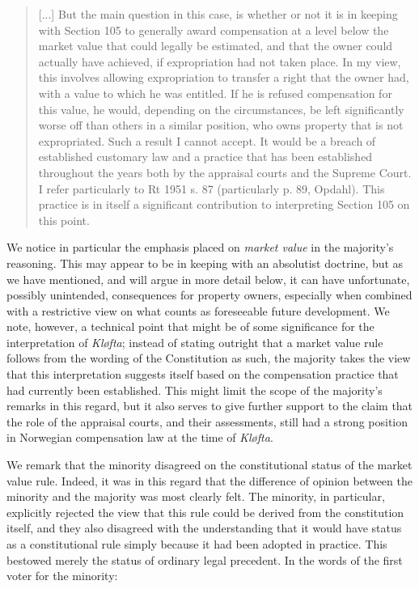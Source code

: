 \begin{quote}
[...] But the main question in this case, is whether or not it is in keeping with Section 105 to generally award compensation at a level below the market value that could legally be estimated, and that the owner could actually have achieved, if expropriation had not taken place. In my view, this involves allowing expropriation to transfer a right that the owner had, with a value to which he was entitled. If he is refused compensation for this value, he would, depending on the circumstances, be left significantly worse off than others in a similar position, who owns property that is not expropriated. Such a result I cannot accept. It would be a breach of established customary law and a practice that has been established throughout the years both by the appraisal courts and the Supreme Court. I refer particularly to Rt 1951 s. 87 (particularly p. 89, Opdahl). This practice is in itself a significant contribution to interpreting Section 105 on this point.
\end{quote}

We notice in particular the emphasis placed on \emph{market value} in the majority's reasoning. This may appear to be in keeping with an absolutist doctrine, but as we have mentioned, and will argue in more detail below, it can have unfortunate, possibly unintended, consequences for property owners, especially when combined with a restrictive view on what counts as foreseeable future development. We note, however, a technical point that might be of some significance for the interpretation of \emph{Kløfta}; instead of stating outright that a market value rule follows from the wording of the Constitution as such, the majority takes the view that this interpretation suggests itself based on the compensation practice that had currently been established. This might limit the scope of the majority's remarks in this regard, but it also serves to give further support to the claim that the role of the appraisal courts, and their assessments, still had a strong position in Norwegian compensation law at the time of \emph{Kløfta}. 

We remark that the minority disagreed on the constitutional status of the market value rule. Indeed, it was in this regard that the difference of opinion between the minority and the majority was most clearly felt. The minority, in particular, explicitly rejected the view that this rule could be derived from the constitution itself, and they also disagreed with the understanding that it would have status as a constitutional rule simply because it had been adopted in practice. This bestowed merely the status of ordinary legal precedent. In the words of the first voter for the minority:

